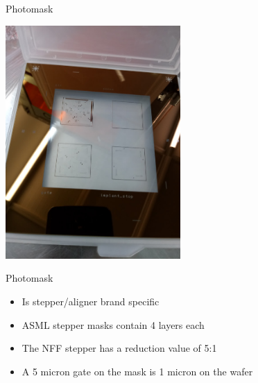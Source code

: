 \documentclass[9pt]{beamer}
\begin{document}
\begin{frame}{Photomask}
\begin{center}
\includegraphics[width=0.5\textwidth]{images/20181207_113845_Burst01.jpg}
\end{center}
\end{frame}

\begin{frame}{Photomask}
	\begin{itemize}
		\item Is stepper/aligner brand specific
		\item ASML stepper masks contain 4 layers each
		\item The NFF stepper has a reduction value of 5:1
		\item A 5 micron gate on the mask is 1 micron on the wafer
	\end{itemize}
\end{frame}
\end{document}

